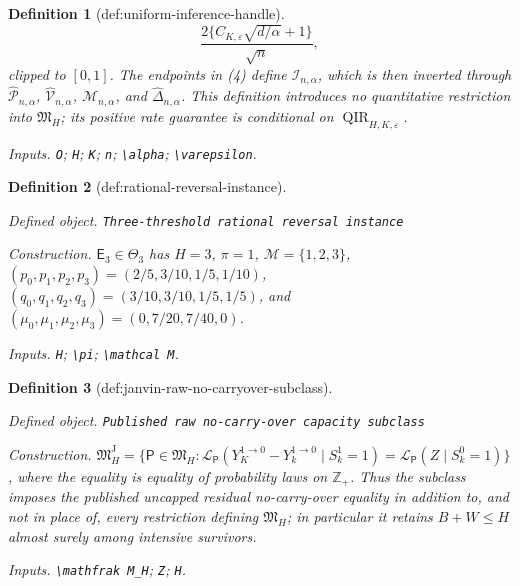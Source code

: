 \documentclass{article}
\newtheorem{definition}{Definition}
\begin{document}
\begin{definition}[def:uniform-inference-handle]
\[
 \frac{2\{C_{K,\varepsilon}\sqrt{d/\alpha}+1\}}{\sqrt n},              \tag{4}
\]
clipped to \([0,1]\).  The endpoints in (4) define \(\mathcal I_{n,\alpha}\), which is then inverted through \(\widehat{\mathcal P}_{n,\alpha}\), \(\widehat{\mathcal V}_{n,\alpha}\), \(\widehat{\mathcal M}_{n,\alpha}\), and \(\widehat\Delta_{n,\alpha}\).  This definition introduces no quantitative restriction into \(\mathfrak M_H\); its positive rate guarantee is conditional on \(\operatorname{QIR}_{H,K,\varepsilon}\).
\par\smallskip\noindent\emph{Inputs.} \texttt{O}; \texttt{H}; \texttt{K}; \texttt{n}; \texttt{\textbackslash{}\allowbreak{}alpha}; \texttt{\textbackslash{}\allowbreak{}varepsilon}.
\end{definition}

\begin{definition}[def:rational-reversal-instance]\label{def:rational-reversal-instance}
\par\smallskip\noindent\emph{Defined object.} \texttt{Three-\allowbreak{}threshold rational reversal instance}
\par\smallskip\noindent\emph{Construction.} \(\mathsf E_3\in\Theta_3\) has \(H=3\), \(\pi=1\), \(\mathcal M=\{1,2,3\}\), \((p_0,p_1,p_2,p_3)=(2/5,3/10,1/5,1/10)\), \((q_0,q_1,q_2,q_3)=(3/10,3/10,1/5,1/5)\), and \((\mu_0,\mu_1,\mu_2,\mu_3)=(0,7/20,7/40,0)\).
\par\smallskip\noindent\emph{Inputs.} \texttt{H}; \texttt{\textbackslash{}\allowbreak{}pi}; \texttt{\textbackslash{}\allowbreak{}mathcal M}.
\end{definition}

\begin{definition}[def:janvin-raw-no-carryover-subclass]\label{def:janvin-raw-no-carryover-subclass}
\par\smallskip\noindent\emph{Defined object.} \texttt{Published raw no-\allowbreak{}carry-\allowbreak{}over capacity subclass}
\par\smallskip\noindent\emph{Construction.} \(\mathfrak M_H^{\mathrm J}=\{\mathsf P\in\mathfrak M_H:\mathcal L_{\mathsf P}(Y_K^{1\to0}-Y_k^{1\to0}\mid S_k^1=1)=\mathcal L_{\mathsf P}(Z\mid S_k^0=1)\}\), where the equality is equality of probability laws on \(\mathbb Z_+\). Thus the subclass imposes the published uncapped residual no-carry-over equality in addition to, and not in place of, every restriction defining \(\mathfrak M_H\); in particular it retains \(B+W\le H\) almost surely among intensive survivors.
\par\smallskip\noindent\emph{Inputs.} \texttt{\textbackslash{}\allowbreak{}mathfrak M\_\allowbreak{}H}; \texttt{Z}; \texttt{H}.
\end{definition}
\end{document}
